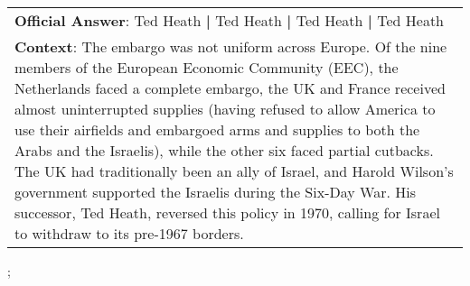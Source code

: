\begin{figure*}[ht]
{\begin{tabular}{p{}}
            \textbf{Official Answer}: Ted Heath \textbf{|} Ted Heath \textbf{|} Ted Heath \textbf{|} Ted Heath                                                                                                                                                                                                                                                                                                                                                                                                                                                                                                                                                    \\
            \textbf{Context}: The embargo was not uniform across Europe. Of the nine members of the European Economic Community (EEC), the Netherlands faced a complete embargo, the UK and France received almost uninterrupted supplies (having refused to allow America to use their airfields and embargoed arms and supplies to both the Arabs and the Israelis), while the other six faced partial cutbacks. The UK had traditionally been an ally of Israel, and Harold Wilson's government supported the Israelis during the Six-Day War. His successor, Ted Heath, reversed this policy in 1970, calling for Israel to withdraw to its pre-1967 borders. \\
        \end{tabular}
    };
    \label{fig:ex-5726487b5951b619008f6ee1}
\end{figure*}

